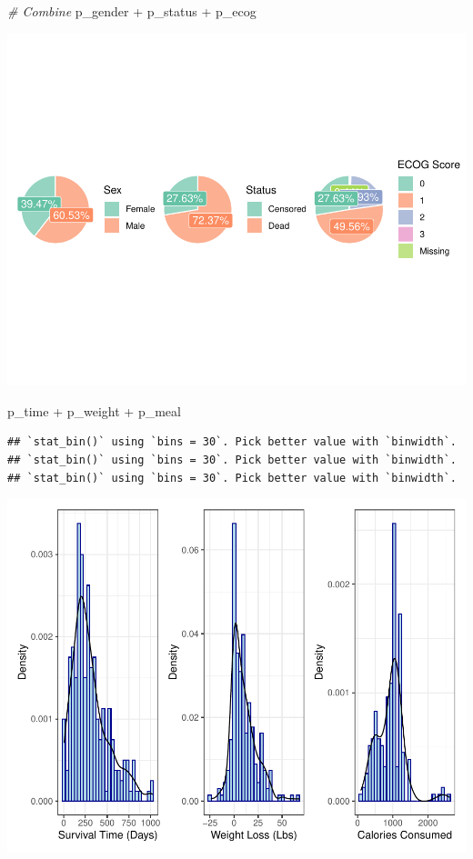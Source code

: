 \documentclass[
]{article}
\newenvironment{Shaded}{\begin{snugshade}}{\end{snugshade}}
\newcommand{\CommentTok}[1]{\textcolor[rgb]{0.56,0.35,0.01}{\textit{#1}}}
\newcommand{\NormalTok}[1]{#1}
\newcommand{\SpecialCharTok}[1]{\textcolor[rgb]{0.00,0.00,0.00}{#1}}
\begin{document}
\begin{Shaded}
\begin{Highlighting}[]
\CommentTok{\# Combine}
\NormalTok{p\_gender  }\SpecialCharTok{+}\NormalTok{ p\_status }\SpecialCharTok{+}\NormalTok{ p\_ecog}
\end{Highlighting}
\end{Shaded}

\includegraphics{final_project_files/figure-latex/unnamed-chunk-6-1.pdf}

\begin{Shaded}
\begin{Highlighting}[]
\NormalTok{p\_time }\SpecialCharTok{+}\NormalTok{ p\_weight }\SpecialCharTok{+}\NormalTok{ p\_meal}
\end{Highlighting}
\end{Shaded}

\begin{verbatim}
## `stat_bin()` using `bins = 30`. Pick better value with `binwidth`.
## `stat_bin()` using `bins = 30`. Pick better value with `binwidth`.
## `stat_bin()` using `bins = 30`. Pick better value with `binwidth`.
\end{verbatim}

\includegraphics{final_project_files/figure-latex/unnamed-chunk-6-2.pdf}
\end{document}
